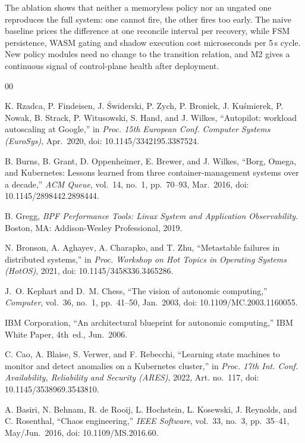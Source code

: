 \documentclass[conference]{IEEEtran}
\begin{document}
The ablation shows that neither a memoryless policy nor an ungated one reproduces the full system: one cannot fire, the other fires too early. The naive baseline prices the difference at one reconcile interval per recovery, while FSM persistence, WASM gating and shadow execution cost microseconds per 5\,s cycle. New policy modules need no change to the transition relation, and M2 gives a continuous signal of control-plane health after deployment.

\begin{thebibliography}{00}

K. Rzadca, P. Findeisen, J. \'{S}widerski, P. Zych, P. Broniek, J. Ku\'{s}mierek, P. Nowak, B. Strack, P. Witusowski, S. Hand, and J. Wilkes, ``Autopilot: workload autoscaling at Google,'' in \textit{Proc. 15th European Conf. Computer Systems (EuroSys)}, Apr.\ 2020, doi: 10.1145/3342195.3387524.

B. Burns, B. Grant, D. Oppenheimer, E. Brewer, and J. Wilkes, ``Borg, Omega, and Kubernetes: Lessons learned from three container-management systems over a decade,'' \textit{ACM Queue}, vol.~14, no.~1, pp.~70--93, Mar.\ 2016, doi: 10.1145/2898442.2898444.

B. Gregg, \textit{BPF Performance Tools: Linux System and Application Observability}. Boston, MA: Addison-Wesley Professional, 2019.

N. Bronson, A. Aghayev, A. Charapko, and T. Zhu, ``Metastable failures in distributed systems,'' in \textit{Proc. Workshop on Hot Topics in Operating Systems (HotOS)}, 2021, doi: 10.1145/3458336.3465286.

J.~O. Kephart and D.~M. Chess, ``The vision of autonomic computing,'' \textit{Computer}, vol.~36, no.~1, pp.~41--50, Jan.\ 2003, doi: 10.1109/MC.2003.1160055.

IBM Corporation, ``An architectural blueprint for autonomic computing,'' IBM White Paper, 4th~ed., Jun.\ 2006.

C. Cao, A. Blaise, S. Verwer, and F. Rebecchi, ``Learning state machines to monitor and detect anomalies on a Kubernetes cluster,'' in \textit{Proc. 17th Int. Conf. Availability, Reliability and Security (ARES)}, 2022, Art. no.~117, doi: 10.1145/3538969.3543810.

A. Basiri, N. Behnam, R. de Rooij, L. Hochstein, L. Kosewski, J. Reynolds, and C. Rosenthal, ``Chaos engineering,'' \textit{IEEE Software}, vol.~33, no.~3, pp.~35--41, May/Jun.\ 2016, doi: 10.1109/MS.2016.60.


\end{thebibliography}
\end{document}
